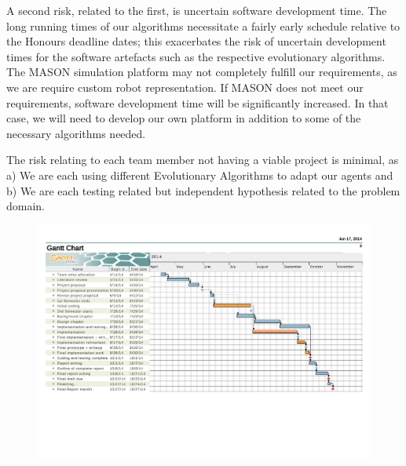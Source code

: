 \documentclass[a4paper,12pt]{article}
\begin{document}
A second risk, related to the first, is uncertain software development time. The long running times of our algorithms necessitate a fairly early schedule relative to the Honours deadline dates; this exacerbates the risk of uncertain development times for the software artefacts such as the respective evolutionary algorithms. The MASON simulation platform may not completely fulfill our requirements, as we are require custom robot representation. If MASON does not meet our requirements, software development time will be significantly increased. In that case, we will need to develop our own platform in addition to some of the necessary algorithms needed.

The risk relating to each team member not having a viable project is minimal, as a) We are each using different Evolutionary Algorithms to adapt our agents and b) We are each testing related but independent hypothesis related to the problem domain.



\begin{landscape}
\appendix
\begin{figure}[H]
\centering
\includegraphics[width=\linewidth]{ganttchart}
\end{figure}
\end{landscape}
\end{document}

